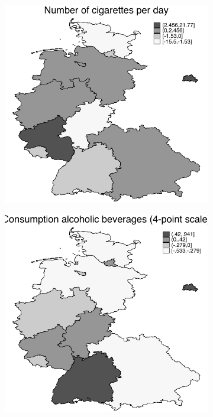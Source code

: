 \documentclass[a4paper ]{article}
\begin{document}
\begin{figure}[p]
\begin{subfigure}[h]{0.4\textwidth}
\end{subfigure}
\par\medskip
\begin{subfigure}[h]{0.4\textwidth}\centering
	\includegraphics[width=\textwidth]{../../analysis/graphs/SOEP/LOCCigarettes.pdf}
\end{subfigure}
\quad
\begin{subfigure}[h]{0.4\textwidth}\centering
	\includegraphics[width=\textwidth]{../../analysis/graphs/SOEP/LOCAlcohol.pdf}
\end{subfigure}
\par\medskip




\end{figure}
\end{document}
